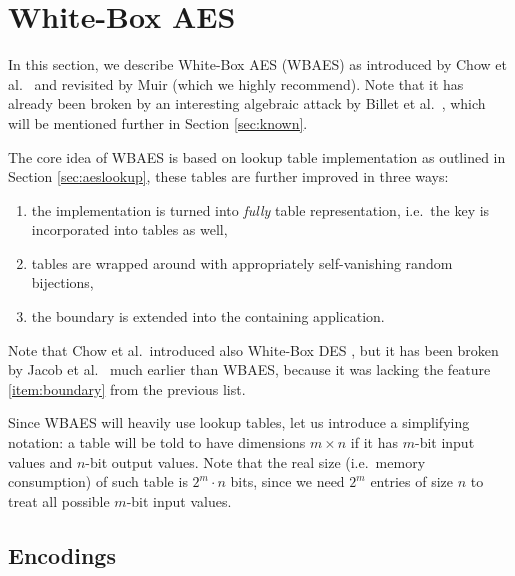 \section{White-Box AES}
\label{sec:wbaes}

In this section, we describe White-Box AES (WBAES) as introduced by Chow et al.\ \cite{chow2002aes} and revisited by Muir \cite{muir2013tutorial} (which we highly recommend). Note that it has already been broken by an interesting algebraic attack by Billet et al.\ \cite{billet2004cryptanalysis}, which will be mentioned further in Section \ref{sec:known}.

The core idea of WBAES is based on lookup table implementation as outlined in Section \ref{sec:aeslookup}, these tables are further improved in three ways:
\begin{enumerate}
	\item the implementation is turned into {\em fully} table representation, i.e.\ the key is incorporated into tables as well,
	\item tables are wrapped around with appropriately self-vanishing random bijections, \label{item:wrap}
	\item the boundary is extended into the containing application. \label{item:boundary}
\end{enumerate}
Note that Chow et al.\ introduced also White-Box DES \cite{chow2002des}, but it has been broken by Jacob et al.\ \cite{jacob2002attacking} much earlier than WBAES, because it was lacking the feature \ref{item:boundary} from the previous list.

\begin{notation}
\label{notation:table}
	Since WBAES will heavily use lookup tables, let us introduce a simplifying notation: a table will be told to have dimensions $m\times n$ if it has $m$-bit input values and $n$-bit output values. Note that the real size (i.e.\ memory consumption) of such table is $2^m\cdot n$ bits, since we need $2^m$ entries of size $n$ to treat all possible $m$-bit input values.
\end{notation}



\subsection{Encodings}
\label{sec:encod}

